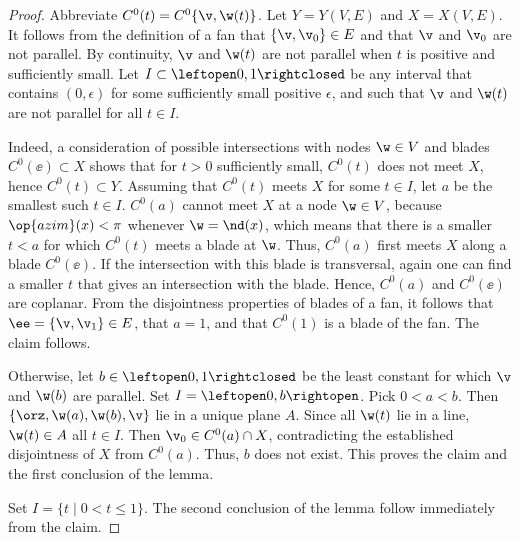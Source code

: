 \begin{proof}
Abbreviate $C^0(t) = C^0\{\v,\w(t)\}$.
Let $Y = Y(V,E)$ and $X = X(V,E)$.
It follows from the definition of a fan that $\{\v,\v_0\}\in E$ and
that $\v$ and $\v_0$ are not parallel.  By continuity, $\v$ and $\w(t)$
are not parallel when $t$ is positive and sufficiently small.  
Let $I\subset\leftopen0,1\rightclosed$ be any interval that contains
$(0,\epsilon)$ for some sufficiently small positive $\epsilon$, and
such that $\v$ and $\w(t)$ are not parallel for all $t\in I$.

  Indeed, a consideration of possible
intersections with nodes $\w\in V$ and blades $C^0(\ee)\subset X$
shows that for $t>0$ sufficiently small, $C^0(t)$ does not meet $X$,
hence $C^0(t)\subset Y$.  Assuming that $C^0(t)$ meets $X$ for some
$t\in I$, let $a$ be the smallest such $t\in I$.  $C^0(a)$ cannot meet
$X$ at a node $\w\in V$, because $\op{azim}(x)<\pi$ whenever
$\w=\nd(x)$, which means that
there is a smaller $t<a$ for which $C^0(t)$ meets a blade at $\w$.
Thus, $C^0(a)$ first meets $X$ along a blade $C^0(\ee)$. If the
intersection with this blade is transversal, again one can find a
smaller $t$ that gives an intersection with the blade.  Hence,
$C^0(a)$ and $C^0(\ee)$ are coplanar.  From the disjointness
properties of blades of a fan, it follows that $\ee = \{\v,\v_1\}\in
E$, that $a=1$, and that $C^0(1)$ is a blade of the fan.  The claim
follows.

  Otherwise, let $b\in
\leftopen0,1\rightclosed$ be the least constant for which $\v$ and
$\w(b)$ are parallel.  Set  $I=\leftopen0,b\rightopen$.  
Pick $0<a<b$. 
Then $\{\orz,\w(a),\w(b),\v\}$ lie in a
unique plane $A$.  Since all $\w(t)$ lie in a line, $\w(t)\in A$ all
$t\in I$.  Then $\v_0\in C^0(a)\cap X$, contradicting the established
disjointness of $X$ from $C^0(a)$.  Thus, $b$ does not exist.  This
proves the claim and the first conclusion of the lemma.

Set $I= \{t\mid 0 < t \le 1\}$.  The second conclusion of the lemma
follow immediately from the claim.
\end{proof}


